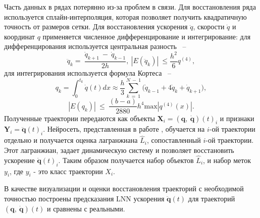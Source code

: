\documentclass[a4paper, 12pt]{article}
\renewcommand{\le}{\ensuremath{\leqslant}}
\begin{document}
 Часть данных в рядах потерянно из-за проблем в связи. Для восстановления ряда используется сплайн-интерполяция, которая позволяет получить квадратичную точность от размеров сетки. Для восстановления ускорения $\ddot{q}$, скорости $\dot{q}$ и координат $q$ применяется численное дифференцирование и интегрирование: 
 для дифференцирования используется центральная разность ~--
\begin{equation}
\ddot{q}_k =\ \frac{\dot{q}_{k+1}\ -\ \dot{q}_{k-1}}{2h},\ \left|E(\ddot{q}_k)\right|\ \le \frac{h^2}{6}q^{(4)},
\end{equation}
для интегрирования используется формула Кортеса ~--
\begin{equation}
q_k = \int_{0}^{t_k}{\dot{q}(t)dx}\approx\frac{h}{3}\sum_{k\ =\ 1}^{N\ -\ 1}{\Big(\dot{q}_{k-1}+4\dot{q}_k+\dot{q}_{k+1}\Big)},
\end{equation}
\begin{equation}
\left|E(q_k)\right|\ \le\ \frac{(b-a)}{2880}h^4\text{max}\left|q^{(4)}\left(x\right)\right|.
\end{equation}
Полученные траектории передаются как объекты $\mathbf{X}_i = (\mathbf{q},\ \mathbf{\dot{q}})(t)_i$ и признаки $\mathbf{Y}_i = \ddot{\mathbf{q}}(t)_i$. Нейросеть, представленная в работе \cite{article}, обучается на $i$-ой траектории отдельно и получается оценка лагранжиана $\hat{L}_i$, сопоставленный $i$-ой траектории. Этот лагранжиан, задает динамическую систему и позволяет восстановить ускорение $\ddot{\mathbf{q}}(t)_i$. Таким образом получается набор объектов $\hat{L}_i$, и набор меток $y_i$, где $y_i$ - это класс траектории $X_i$.

В качестве визуализации и оценки восстановления траекторий с необходимой точностью построены предсказания LNN ускорения $\ddot{\mathbf{q}}(t)$ для траекторий $(\mathbf{q},\ \mathbf{\dot{q}})(t)$ и сравнены с реальными.
\end{document}
